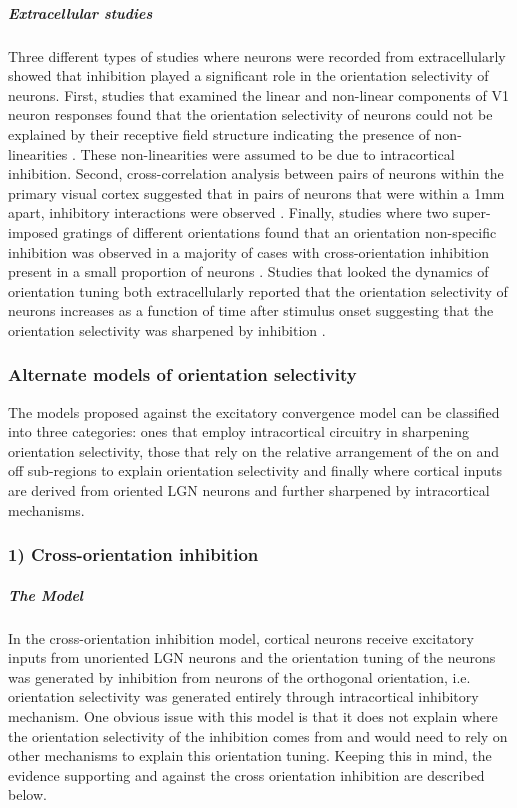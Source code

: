 \subparagraph{Extracellular studies}

Three different types of studies where neurons were recorded from extracellularly showed that inhibition played a significant role in the orientation selectivity of neurons. First, studies that examined the linear and non-linear components of V1 neuron responses found that the orientation selectivity of neurons could not be explained by their receptive field structure indicating the presence of non-linearities \cite{Watkins1974, Gardner1999}. These non-linearities were assumed to be due to intracortical inhibition. Second, cross-correlation analysis between pairs of neurons within the primary visual cortex suggested that in pairs of neurons that were within a 1mm apart, inhibitory interactions were observed \cite{Hata1988}. Finally, studies where two super-imposed gratings of different orientations found that an orientation non-specific inhibition was observed in a majority of cases with cross-orientation inhibition present in a small proportion of neurons \cite{Bonds1989}. Studies that looked the dynamics of orientation tuning both extracellularly reported that the orientation selectivity of neurons increases as a function of time after stimulus onset suggesting that the orientation selectivity was sharpened by inhibition \cite{Shapley2003}.

\subsubsection{Alternate models of orientation selectivity}

The models proposed against the excitatory convergence model can be classified into three categories: ones that employ intracortical circuitry in sharpening orientation selectivity, those that rely on the relative arrangement of the on and off sub-regions to explain orientation selectivity and finally where cortical inputs are derived from oriented LGN neurons and further sharpened by intracortical mechanisms.

\subsubsection{1) Cross-orientation inhibition}

\subparagraph{The Model} In the cross-orientation inhibition model, cortical neurons receive excitatory inputs from unoriented LGN neurons and the orientation tuning of the neurons was generated by inhibition from neurons of the orthogonal orientation, i.e. orientation selectivity was generated entirely through intracortical inhibitory mechanism. One obvious issue with this model is that it does not explain where the orientation selectivity of the inhibition comes from and would need to rely on other mechanisms to explain this orientation tuning. Keeping this in mind, the evidence supporting and against the cross orientation inhibition are described below. 

